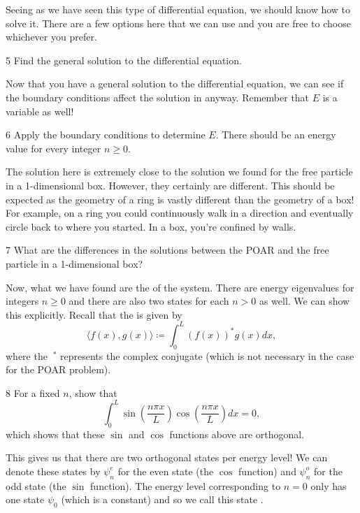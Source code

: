 \documentclass{article}
\begin{document}
\noindent Seeing as we have seen this type of differential equation, we should know how to solve it.  There are a few options here that we can use and you are free to choose whichever you prefer.

\begin{problem}{}{5}
Find the general solution to the differential equation.
\end{problem}

\noindent Now that you have a general solution to the differential equation, we can see if the boundary conditions affect the solution in anyway. Remember that $E$ is a variable as well! 

\begin{problem}{}{6}
Apply the boundary conditions to determine $E$. There should be an energy value for every integer $n\geq 0$.
\end{problem}

\noindent The solution here is extremely close to the solution we found for the free particle in a 1-dimensional box. However, they certainly are different. This should be expected as the geometry of a ring is vastly different than the geometry of a box! For example, on a ring you could continuously walk in a direction and eventually circle back to where you started. In a box, you're confined by walls.

\begin{problem}{}{7}
What are the differences in the solutions between the POAR and the free particle in a 1-dimensional box? 
\end{problem}

Now, what we have found are the  of the system.  There are energy eigenvalues for integers $n\geq 0$ and there are also two  states for each $n>0$ as well.  We can show this explicitly. Recall that the  is given by
\[
\langle f(x),g(x)\rangle \coloneqq \int_0^L (f(x))^*g(x)dx,
\]
where the $~^*$ represents the complex conjugate (which is not necessary in the case for the POAR problem).

\begin{problem}{}{8}
For a fixed $n$, show that
\[
\int_0^L \sin\left(\frac{n\pi x}{L}\right) \cos \left(\frac{n\pi x}{L}\right) dx = 0,
\]
which shows that these $\sin$ and $\cos$ functions above are orthogonal.  
\end{problem}
This gives us that there are two orthogonal states per energy level! We can denote these states by $\psi_n^e$ for the even state (the $\cos$ function) and $\psi_n^o$ for the odd state (the $\sin$ function). The energy level corresponding to $n=0$ only has one state $\psi_0$ (which is a constant) and so we call this state .
\end{document}
